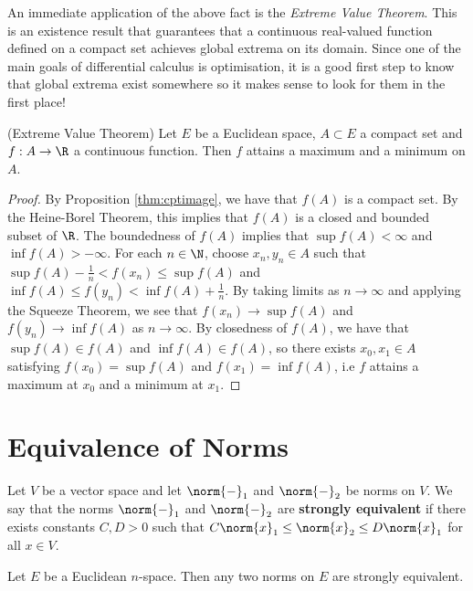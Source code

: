  An immediate application of the above fact is the \emph{Extreme Value Theorem}. This is an existence result that guarantees that a continuous real-valued function defined on a compact set achieves global extrema on its domain. Since one of the main goals of differential calculus is optimisation, it is a good first step to know that global extrema exist somewhere so it makes sense to look for them in the first place!
 \begin{theorem}
   (Extreme Value Theorem) Let \( E \) be a Euclidean space, \( A\subset E \) a compact set and \( f:A\to\R \) a continuous function. Then \( f \) attains a maximum and a minimum on \( A \).
 \end{theorem}
 \begin{proof}
   By Proposition \ref{thm:cptimage}, we have that \( f(A) \) is a compact set. By the Heine-Borel Theorem, this implies that \( f(A) \) is a closed and bounded subset of \( \R \). The boundedness of \( f(A) \) implies that \( \sup f(A)<\infty \) and \( \inf f(A)>-\infty \). For each \( n\in\N \), choose \( x_n,y_n\in A \) such that \( \sup f(A)-\frac{1}{n}<f(x_n)\leq\sup f(A) \) and \( \inf f(A)\leq f(y_n)<\inf f(A)+\frac{1}{n} \). By taking limits as \( n\to\infty \) and applying the Squeeze Theorem, we see that \( f(x_n)\to\sup f(A) \) and \( f(y_n)\to\inf f(A) \) as \( n\to\infty \). By closedness of \( f(A) \), we have that \( \sup f(A)\in f(A) \) and \( \inf f(A)\in f(A) \), so there exists \( x_0,x_1\in A \) satisfying \( f(x_0)=\sup f(A) \) and \( f(x_1)=\inf f(A) \), i.e \( f \) attains a maximum at \( x_0 \) and a minimum at \( x_1 \).
 \end{proof}
 
 \section{Equivalence of Norms}
 \begin{definition}
   Let \( V \) be a vector space and let \( \norm{-}_1 \) and \( \norm{-}_2 \) be norms on \( V \). We say that the norms \( \norm{-}_1 \) and \( \norm{-}_2 \) are \textbf{strongly equivalent} if there exists constants \( C,D>0 \) such that \( C\norm{x}_1\leq \norm{x}_2\leq D\norm{x}_1 \) for all \( x\in V \).
 \end{definition}

 \begin{theorem}
   Let \( E \) be a Euclidean \( n \)-space. Then any two norms on \( E \) are strongly equivalent.
 \end{theorem}

